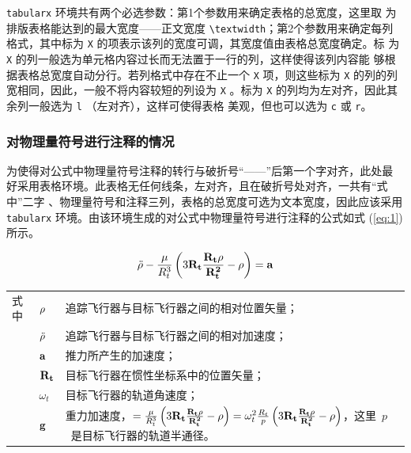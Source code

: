 \texttt{tabularx} 环境共有两个必选参数：第1个参数用来确定表格的总宽度，这里取
为排版表格能达到的最大宽度——正文宽度 \verb|\textwidth|；第2个参数用来确定每列
格式，其中标为 \verb|X| 的项表示该列的宽度可调，其宽度值由表格总宽度确定。标
为 \verb|X| 的列一般选为单元格内容过长而无法置于一行的列，这样使得该列内容能
够根据表格总宽度自动分行。若列格式中存在不止一个 \verb|X| 项，则这些标为
\verb|X| 的列的列宽相同，因此，一般不将内容较短的列设为 \verb|X| 。标为
\verb|X| 的列均为左对齐，因此其余列一般选为 \verb|l| （左对齐），这样可使得表格
美观，但也可以选为 \verb|c| 或 \verb|r|。

\subsubsection{对物理量符号进行注释的情况}

为使得对公式中物理量符号注释的转行与破折号“——”后第一个字对齐，此处最
好采用表格环境。此表格无任何线条，左对齐，且在破折号处对齐，一共有“式中”二字
、物理量符号和注释三列，表格的总宽度可选为文本宽度，因此应该采用
\texttt{tabularx} 环境。由该环境生成的对公式中物理量符号进行注释的公式如式
(\ref{eq:1})所示。

\begin{equation}
\label{eq:1}
\ddot{\bf{\rho}}-\frac{\mu}{R_t^3}\left(3\bf{R_t}\frac{\bf{R_t\rho}}{R_t^2}-\bf{\rho}\right)=\bf{a}
\end{equation}
\begin{flushleft}
\renewcommand\arraystretch{1.25}
\begin{tabularx}{\textwidth}{@{}>{\normalsize\rm}l@{\quad}>{\normalsize\rm}l@{——}>{\normalsize\rm}X@{}}
式中& $\bf{\rho}$ &追踪飞行器与目标飞行器之间的相对位置矢量；\\
&  $\ddot{\bf{\rho}}$&追踪飞行器与目标飞行器之间的相对加速度；\\
&  $\bf{a}$   &推力所产生的加速度；\\
&  $\bf{R_t}$ & 目标飞行器在惯性坐标系中的位置矢量；\\
&  $\omega_{t}$ & 目标飞行器的轨道角速度；\\
&  $\bf{g}$ & 重力加速度，$=\frac{\mu}{R_{t}^{3}}\left(
3\bf{R_{t}}\frac{\bf{R_{t}\rho}}{R_{t}^{2}}-\bf{\rho}\right)=\omega_{t}^{2}\frac{R_{t}}{p}\left(
3\bf{R_{t}}\frac{\bf{R_{t}\rho}}{R_{t}^{2}}-\bf{\rho}\right)$，这里~$p$~是目标飞行器的轨道半通径。
\end{tabularx}\vspace{.5ex}%
\end{flushleft}

